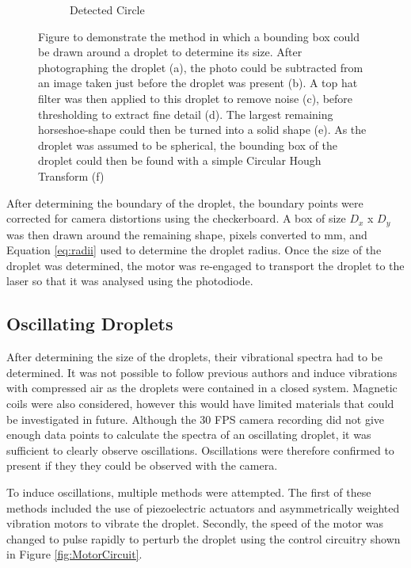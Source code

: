 \documentclass{physics_article_B}
\begin{document}
\begin{figure}[H]
\begin{subfigure}[b]{0.3\textwidth}
                        \caption{Detected Circle}
                        \label{fig:size:6}
                    \end{subfigure}
                    \caption{Figure to demonstrate the method in which a bounding box could be drawn around a droplet to determine its size. After photographing the droplet (a), the photo could be subtracted from an image taken just before the droplet was present (b). A top hat filter was then applied to this droplet to remove noise (c), before thresholding to extract fine detail (d). The largest remaining horseshoe-shape could then be turned into a solid shape (e). As the droplet was assumed to be spherical, the bounding box of the droplet could then be found with a simple Circular Hough Transform (f) }\label{fig:size}
                \end{figure}
            
        After determining the boundary of the droplet, the boundary points were corrected for camera distortions using the checkerboard. A box of size $D_x$ x $D_y$ was then drawn around the remaining shape, pixels converted to mm, and Equation \ref{eq:radii} used to determine the droplet radius. Once the size of the droplet was determined, the motor was re-engaged to transport the droplet to the laser so that it was analysed using the photodiode.
    
    \subsection{Oscillating Droplets\label{sect:method:oscillating}}
        
        After determining the size of the droplets, their vibrational spectra had to be determined. It was not possible to follow previous authors and induce vibrations with compressed air as the droplets were contained in a closed system. Magnetic coils were also considered, however this would have limited materials that could be investigated in future. Although the 30 FPS camera recording did not give enough data points to calculate the spectra of an oscillating droplet, it was sufficient to clearly observe oscillations. Oscillations were therefore confirmed to present if they they could be observed with the camera.
        
        To induce oscillations, multiple methods were attempted. The first of these methods included the use of piezoelectric actuators and asymmetrically weighted vibration motors to vibrate the droplet. Secondly, the speed of the motor was changed to pulse rapidly to perturb the droplet using the control circuitry shown in Figure \ref{fig:MotorCircuit}. 
        
\end{document}
